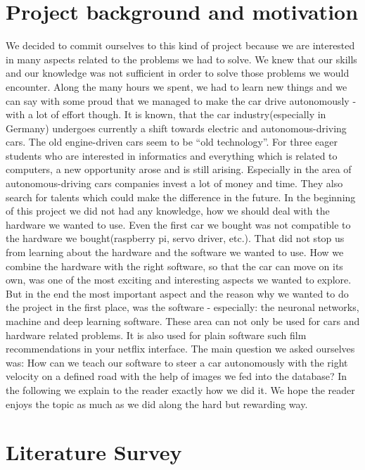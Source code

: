 \documentclass[journal]{IEEEtran}
\begin{document}
\section{Project background and motivation}
\label{sec:backgroundMotivation}
We decided to commit ourselves to this kind of project because we are interested in many aspects related to the problems we had to solve. We knew that our skills and our knowledge was not sufficient in order to solve those problems we would encounter. Along the many hours we spent, we had to learn new things and we can say with some proud that we managed to make the car drive autonomously - with a lot of effort though.
It is known, that the car industry(especially in Germany) undergoes currently a shift towards electric and autonomous-driving cars. The old engine-driven cars seem to be “old technology”. For three eager students who are interested in informatics and everything which is related to computers, a new opportunity arose and is still arising. Especially in the area of autonomous-driving cars companies invest a lot of money and time. They also search for talents which could make the difference in the future.
In the beginning of this project we did not had any knowledge, how we should deal with the hardware we wanted to use. Even the first car we bought was not compatible to the hardware we bought(raspberry pi, servo driver, etc.). That did not stop us from learning about the hardware and the software we wanted to use. How we combine the hardware with the right software, so that the car can move on its own, was one of the most exciting and interesting aspects we wanted to explore.
But in the end the most important aspect and the reason why we wanted to do the project in the first place, was the software - especially: the neuronal networks, machine and deep learning software. These area can not only be used for cars and hardware related problems. It is also used for plain software such film recommendations in your netflix interface.
The main question we asked ourselves was: How can we teach our software to steer a car autonomously with the right velocity on a defined road with the help of images we fed into the database? 
In the following we explain to the reader exactly how we did it. We hope the reader enjoys the topic as much as we did along the hard but rewarding way.

\section{Literature Survey}
\label{sec:LiteratureSurvey}
\end{document}
